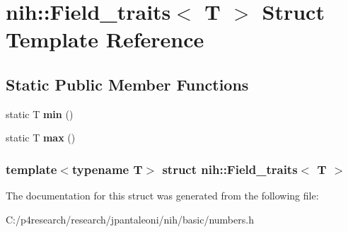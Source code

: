 \hypertarget{structnih_1_1_field__traits}{
\section{nih\-:\-:\-Field\-\_\-traits$<$ \-T $>$ \-Struct \-Template \-Reference}
\label{structnih_1_1_field__traits}
}
\subsection*{\-Static \-Public \-Member \-Functions}
\begin{DoxyCompactItemize}
\item 
\hypertarget{structnih_1_1_field__traits_a65b7bff62f01bb41980a384c68e21c18}{
static \-T {\bfseries min} ()}
\label{structnih_1_1_field__traits_a65b7bff62f01bb41980a384c68e21c18}

\item 
\hypertarget{structnih_1_1_field__traits_aba5164b6edfbcae7d2865db7c3f9febe}{
static \-T {\bfseries max} ()}
\label{structnih_1_1_field__traits_aba5164b6edfbcae7d2865db7c3f9febe}

\end{DoxyCompactItemize}
\subsubsection*{template$<$typename T$>$ struct nih\-::\-Field\-\_\-traits$<$ T $>$}



\-The documentation for this struct was generated from the following file\-:\begin{DoxyCompactItemize}
\item 
\-C\-:/p4research/research/jpantaleoni/nih/basic/numbers.\-h\end{DoxyCompactItemize}
